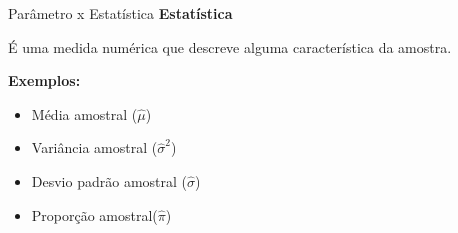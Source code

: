 \begin{frame}{Parâmetro x Estatística}
\textbf{Estatística}
\begin{definicao}
    É uma medida numérica  que descreve alguma característica da amostra.
\end{definicao}


\textbf{Exemplos:}
\begin{itemize}
    \item Média amostral ($\hat{\mu}$)
    \item Variância amostral ($\hat{\sigma}^2$)
    \item Desvio padrão amostral ($\hat{\sigma}$)
    \item Proporção amostral($\hat{\pi}$)
\end{itemize}
\end{frame}



    



